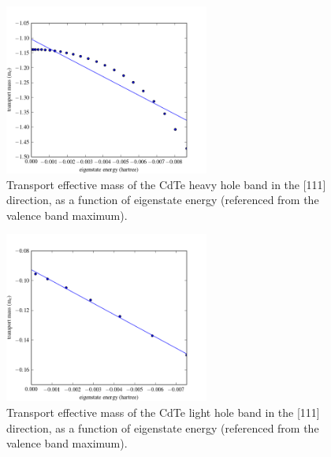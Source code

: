 \begin{figure}[htb]
\includegraphics[width=0.6\textwidth]{./figures/ch4/mt_E_hh.png}
\caption[Transport effective mass of the CdTe heavy hole]{\label{mt_E_hh}Transport effective mass of the CdTe heavy hole band in the [111] direction, as a function of eigenstate energy (referenced from the valence band maximum).}
\end{figure}

\begin{figure}[htb]
\includegraphics[width=0.6\textwidth]{./figures/ch4//mt_E_lh.png}
\caption[Transport effective mass of the CdTe light hole]{\label{mt_E_lh}Transport effective mass of the CdTe light hole band in the [111] direction, as a function of eigenstate energy (referenced from the valence band maximum).}
\end{figure}

